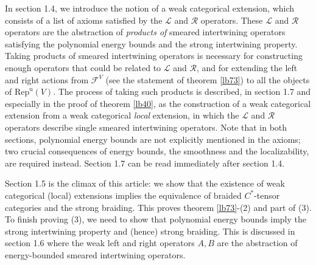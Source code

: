 \documentclass[11pt,b5paper,notitlepage]{article}
\theoremstyle{definition}
\theoremstyle{plain}
\newcommand{\mc}{\mathcal}
\newcommand{\Repu}{\mathrm{Rep}^{\mathrm u}}
\newcommand{\scr}{\mathscr}
\numberwithin{equation}{subsection}
\begin{document}
In section 1.4, we introduce the notion of a weak categorical extension, which consists of a list of axioms satisfied by the $\mc L$ and $\mc R$ operators. These $\mc L$ and $\mc R$ operators are the abstraction of \emph{products of} smeared intertwining operators satisfying the polynomial energy bounds and the strong intertwining property. Taking products  of smeared intertwining operators is necessary for  constructing enough operators that could be related to $\scr L$ and $\scr R$, and for extending the left and right actions from $\mc F^V$ (see the statement of theorem \ref{lb73}) to all the objects of $\Repu(V)$. The process of taking such products is described, in section 1.7 and especially in the proof of theorem \ref{lb40}, as the construction of a weak categorical extension from a weak categorical \emph{local} extension, in which the $\mc L$ and $\mc R$ operators describe single smeared intertwining operators. Note that in both sections, polynomial energy bounds are not explicitly mentioned in the axioms; two crucial consequences of energy bounds, the smoothness and the localizability, are required instead. Section 1.7 can be read immediately after section 1.4.

Section 1.5 is the climax of this article: we show that the existence of weak categorical (local) extensions implies the equivalence of braided $C^*$-tensor categories and the strong braiding. This proves theorem \ref{lb73}-(2) and part of (3). To finish proving (3), we need to show that polynomial energy bounds imply  the strong intertwining property and (hence) strong braiding. This is discussed in section 1.6 where the weak left and right operators $A,B$ are the abstraction of energy-bounded smeared intertwining operators. 
\end{document}
